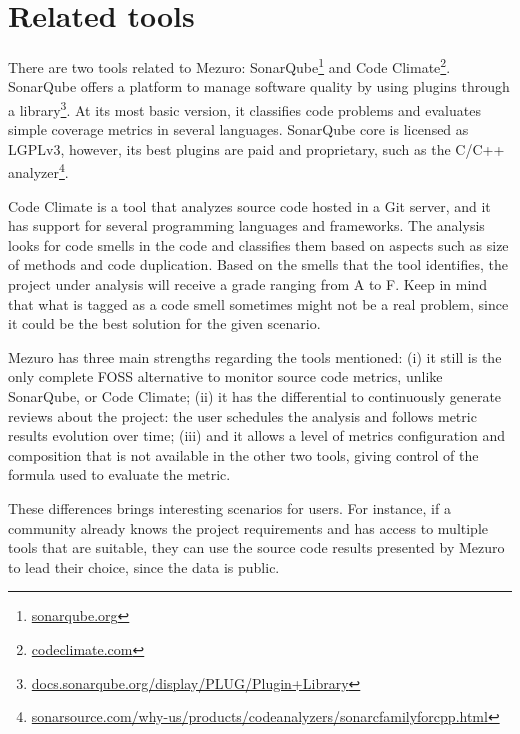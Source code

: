 \section{Related tools}

There are two tools related to Mezuro: SonarQube\footnote{\url{sonarqube.org}}
and Code Climate\footnote{\url{codeclimate.com}}. SonarQube offers a platform
to manage software quality by using plugins through a
library\footnote{\url{docs.sonarqube.org/display/PLUG/Plugin+Library}}.
%
At its most basic version, it classifies code problems and evaluates simple
coverage metrics in several languages. SonarQube core is licensed as LGPLv3,
however, its best plugins are paid and proprietary, such as the C/C++
analyzer\footnote{\url{sonarsource.com/why-us/products/codeanalyzers/sonarcfamilyforcpp.html}}.

Code Climate is a tool that analyzes source code hosted in a Git server, and it
has support for several programming languages and frameworks. The analysis
looks for code smells in the code and classifies them based on aspects such as
size of methods and code duplication. Based on the smells that the tool
identifies, the project under analysis will receive a grade ranging from A to
F. Keep in mind that what is tagged as a code smell sometimes might not be a
real problem, since it could be the best solution for the given scenario.

Mezuro has three main strengths regarding the tools mentioned: (i) it still
is the only complete FOSS alternative to monitor source code metrics, unlike
SonarQube, or Code Climate; (ii) it has the differential to continuously
generate reviews about the project: the user schedules the analysis and follows
metric results evolution over time; (iii) and it allows a level of metrics
configuration and composition that is not available in the other two tools,
giving control of the formula used to evaluate the metric.

These differences brings interesting scenarios for users. For instance, if a
community already knows the project requirements and has access to multiple
tools that are suitable, they can use the source code results presented by
Mezuro to lead their choice, since the data is public.
